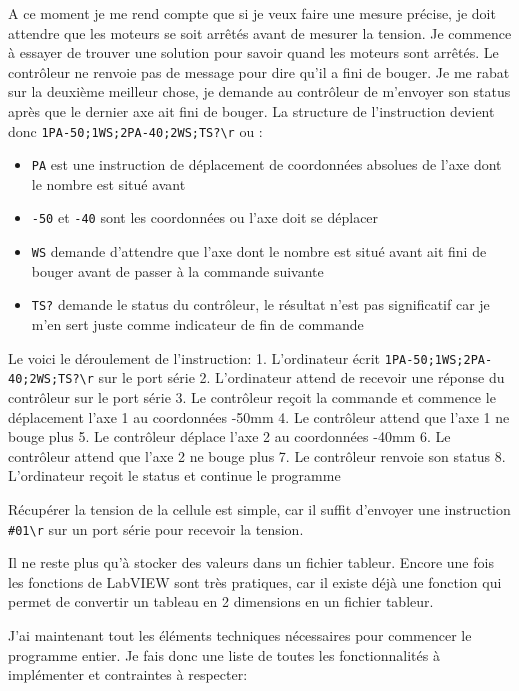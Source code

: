 \documentclass[a4paper, 12pt]{article}
\begin{document}
A ce moment je me rend compte que si je veux faire une mesure précise, je doit attendre que les moteurs se soit arrêtés avant de mesurer la tension.  
Je commence à essayer de trouver une solution pour savoir quand les moteurs sont arrêtés.  
Le contrôleur ne renvoie pas de message pour dire qu'il a fini de bouger.  
Je me rabat sur la deuxième meilleur chose, je demande au contrôleur de m'envoyer son status après que le dernier axe ait fini de bouger.  
La structure de l'instruction devient donc \verb|1PA-50;1WS;2PA-40;2WS;TS?\r| ou :  
\begin{itemize}
	\item \verb|PA| est une instruction de déplacement de coordonnées absolues de l'axe dont le nombre est situé avant  
	\item \verb|-50| et \verb|-40| sont les coordonnées ou l'axe doit se déplacer  
	\item \verb|WS| demande d'attendre que l'axe dont le nombre est situé avant ait fini de bouger avant de passer à la commande suivante  
	\item \verb|TS?| demande le status du contrôleur, le résultat n'est pas significatif car je m'en sert juste comme indicateur de fin de commande  
\end{itemize}
Le voici le déroulement de l'instruction:  
1. L'ordinateur écrit \verb|1PA-50;1WS;2PA-40;2WS;TS?\r| sur le port série  
2. L'ordinateur attend de recevoir une réponse du contrôleur sur le port série  
3. Le contrôleur reçoit la commande et commence le déplacement l'axe 1 au coordonnées -50mm  
4. Le contrôleur attend que l'axe 1 ne bouge plus  
5. Le contrôleur déplace l'axe 2 au coordonnées -40mm  
6. Le contrôleur attend que l'axe 2 ne bouge plus  
7. Le contrôleur renvoie son status  
8. L'ordinateur reçoit le status et continue le programme  
  
Récupérer la tension de la cellule est simple, car il suffit d'envoyer une instruction \verb|#01\r| sur un port série pour recevoir la tension.  
  
Il ne reste plus qu'à stocker des valeurs dans un fichier tableur.  
Encore une fois les fonctions de LabVIEW sont très pratiques, car il existe déjà une fonction qui permet de convertir un tableau en 2 dimensions en un fichier tableur.  
  
J'ai maintenant tout les éléments techniques nécessaires pour commencer le programme entier.  
Je fais donc une liste de toutes les fonctionnalités à implémenter et contraintes à respecter:  
\end{document}
